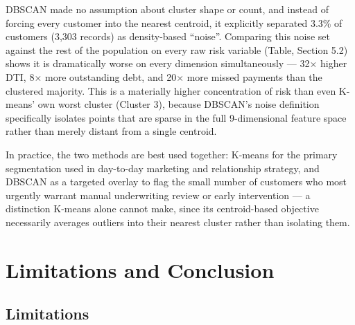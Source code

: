 \documentclass[11pt]{article}
\begin{document}
DBSCAN made no assumption about cluster shape or count, and instead of forcing every customer into the nearest centroid, it explicitly separated 3.3\% of customers (3{,}303 records) as density-based ``noise''. Comparing this noise set against the rest of the population on every raw risk variable (Table, Section 5.2) shows it is dramatically worse on every dimension simultaneously --- 32$\times$ higher DTI, 8$\times$ more outstanding debt, and 20$\times$ more missed payments than the clustered majority. This is a materially higher concentration of risk than even K-means' own worst cluster (Cluster 3), because DBSCAN's noise definition specifically isolates points that are sparse in the full 9-dimensional feature space rather than merely distant from a single centroid.

In practice, the two methods are best used together: K-means for the primary segmentation used in day-to-day marketing and relationship strategy, and DBSCAN as a targeted overlay to flag the small number of customers who most urgently warrant manual underwriting review or early intervention --- a distinction K-means alone cannot make, since its centroid-based objective necessarily averages outliers into their nearest cluster rather than isolating them.

\section{Limitations and Conclusion}
\label{sec:limitations}

\subsection{Limitations}
\end{document}

